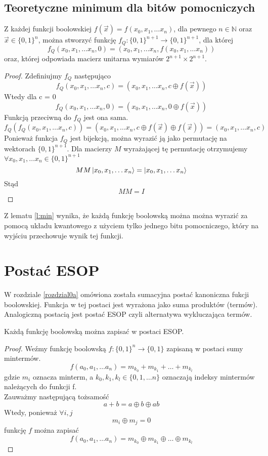 \subsection{Teoretyczne minimum dla bitów pomocniczych}
\begin{lemma}
    \label{l:min}
    Z każdej funkcji boolowskiej $f(\vec{x}) = f(x_0, x_1, \ldots x_n)$, dla pewnego $n \in \mathbb{N}$ oraz $\vec{x} \in \{0, 1\}^n$, można stworzyć funkcję $f_Q : \{0, 1\}^{n+1}\rightarrow \{0, 1\}^{n+1}$, dla której 
    \[f_Q(x_0, x_1, \ldots x_n, 0) = (x_0, x_1, \ldots x_n, f(x_0, x_1, \ldots x_n))\] 
    oraz, której odpowiada macierz unitarna wymiarów $2^{n+1} \times 2^{n+1}$.
\end{lemma}
\begin{proof}
    Zdefiniujmy $f_Q$ następująco
    \[f_Q(x_0, x_1, \ldots x_n, c) = (x_0, x_1, \ldots x_n, c \oplus f(\vec{x}))\]
    Wtedy dla c = 0
    \[f_Q(x_0, x_1, \ldots x_n, 0) = (x_0, x_1, \ldots x_n, 0 \oplus f(\vec{x}))\]
    Funkcją przeciwną do $f_Q$ jest ona sama.
    \[f_Q(f_Q(x_0, x_1, \ldots x_n, c)) = (x_0, x_1, \ldots x_n, c \oplus f(\vec{x}) \oplus f(\vec{x})) = (x_0, x_1, \ldots x_n, c)\]
    Ponieważ funkcja $f_Q$ jest bijekcją, można wyrazić ją jako permutację na wektorach $\{0,1\}^{n+1}$. Dla macierzy $M$ wyrażającej tę permutację otrzymujemy $\forall x_0, x_1, \ldots x_n \in \{0,1\}^{n+1}$
    \[MM\ket{x_0, x_1, \ldots x_n} = \ket{x_0, x_1, \ldots x_n}\]
    Stąd
    \[MM = I\]
\end{proof}
Z lematu \ref{l:min} wynika, że każdą funkcję boolowską można można wyrazić za pomocą układu kwantowego z użyciem tylko jednego bitu pomocniczego, który na wyjściu przechowuje wynik tej funkcji.
\section{Postać ESOP}
W rozdziale \ref{rozdzial0a} omówiona została sumacyjna postać kanoniczna fukcji boolowskiej. Funkcja w tej postaci jest wyrażona jako suma produktów (termów). Analogiczną postacią jest postać ESOP czyli alternatywa wykluczająca termów.
\begin{theorem}
    Każdą funkcję boolowską można zapisać w postaci ESOP.
\end{theorem}
\begin{proof}
    Weźmy funkcję boolowską $f: \{0, 1\}^n \rightarrow \{0, 1\}$ zapisaną w postaci sumy mintermów.
    \[f(a_0, a_1, \ldots a_n) = m_{k_0} + m_{k_1} + \ldots + m_{k_l}\]
    gdzie $m_i$ oznacza minterm, a $k_0, k_1, k_l \in \{0, 1, \ldots n\}$ oznaczają indeksy mintermów należących do funkcji f.\\
    Zauważmy następującą tożsamość
    \[a + b = a \oplus b \oplus ab\]
    Wtedy, ponieważ $\forall i,j$
    \[m_i \oplus m_j = 0\]
    funkcję $f$ można zapisać
    \[f(a_0, a_1, \ldots a_n) = m_{k_0} \oplus m_{k_1} \oplus \ldots \oplus m_{k_l}\]
\end{proof}
